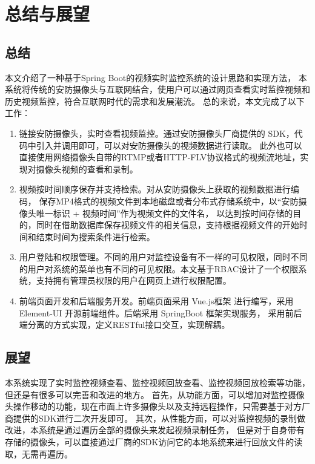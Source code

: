 \chapter{总结与展望}
\section{总结}
本文介绍了一种基于Spring Boot的视频实时监控系统的设计思路和实现方法，
本系统将传统的安防摄像头与互联网结合，使用户可以通过网页查看实时监控视频和历史视频监控，符合互联网时代的需求和发展潮流。
总的来说，本文完成了以下工作：

\begin{enumerate}
    \item 链接安防摄像头，实时查看视频监控。通过安防摄像头厂商提供的 SDK，代码中引入并调用即可，可以对安防摄像头的视频数据进行读取。
    此外也可以直接使用网络摄像头自带的RTMP或者HTTP-FLV协议格式的视频流地址，实现对摄像头视频的查看和录制。
    \item 视频按时间顺序保存并支持检索。对从安防摄像头上获取的视频数据进行编码，
    保存MP4格式的视频文件到本地磁盘或者分布式存储系统中，以“安防摄像头唯一标识 + 视频时间”作为视频文件的文件名，
    以达到按时间存储的目的，同时在借助数据库保存视频文件的相关信息，支持根据视频文件的开始时间和结束时间为搜索条件进行检索。
    \item 用户登陆和权限管理。不同的用户对监控设备有不一样的可见权限，同时不同的用户对系统的菜单也有不同的可见权限。本文基于RBAC设计了一个权限系统，支持拥有管理员权限的用户在网页上进行权限配置。
    \item 前端页面开发和后端服务开发。前端页面采用 Vue.js框架 进行编写，采用 Element-UI 开源前端组件。后端采用  SpringBoot 框架实现服务，
    采用前后端分离的方式实现，定义RESTful接口交互，实现解耦。
\end{enumerate}


\section{展望}
本系统实现了实时监控视频查看、监控视频回放查看、监控视频回放检索等功能，但还是有很多可以完善和改进的地方。
首先，从功能方面，可以增加对监控摄像头操作移动的功能，现在市面上许多摄像头以及支持远程操作，只需要基于对方厂商提供的SDK进行二次开发即可。
其次，从性能方面，可以对监控视频的录制做改进，本系统是通过遍历全部的摄像头来发起视频录制任务，
但是对于自身带有存储的摄像头，可以直接通过厂商的SDK访问它的本地系统来进行回放文件的读取，无需再遍历。
